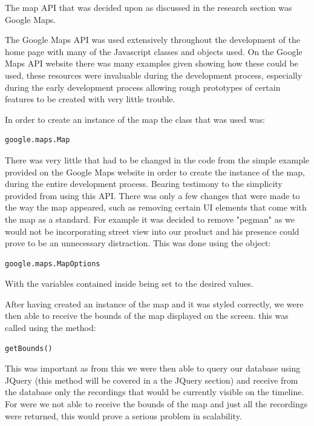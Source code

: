 \documentclass{l3proj}
\begin{document}
The map API that was decided upon as discussed in the research section
was Google Maps. 

The Google Maps API was used extensively throughout the development of
the home page with many of the Javascript classes and objects used. On
the Google Maps API website there was many examples given showing how
these could be used, these resources were invaluable during the
development process, especially during the early development process
allowing rough prototypes of certain features to be created with very
little trouble.

In order to create an instance of the map the class that was used was:
\begin{verbatim}
google.maps.Map
\end{verbatim}
There was very little that had to be changed in the code from the
simple example provided on the Google Maps website in order to create
the instance of the map, during the entire development
process. Bearing testimony to the simplicity provided from using this
API. There was only a few changes that were made to the way the map
appeared, such as removing certain UI elements that come with the map
as a standard. For example it was decided to remove "pegman" as we
would not be incorporating street view into our product and his
presence could prove to be an unnecessary distraction. This was done
using the object:
\begin{verbatim}
google.maps.MapOptions
\end{verbatim}
With the variables contained inside being set to the desired values.

After having created an instance of the map and it was styled
correctly, we were then able to receive the bounds of the map
displayed on the screen. this was called using the method:
\begin{verbatim}
getBounds()
\end{verbatim}
This was important as from this we were then able to query our
database using JQuery (this method will be covered in a the JQuery
section) and receive from the database only the recordings that would
be currently visible on the timeline. For were we not able to receive
the bounds of the map and just all the recordings were returned, this
would prove a serious problem in scalability.
\end{document}
